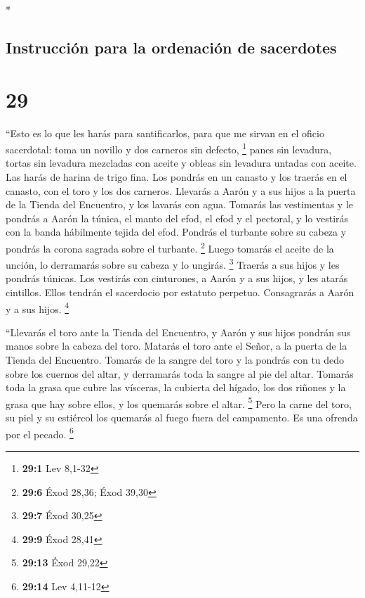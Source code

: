 \begin{paracol}{2}
\begin{otherlanguage}{english}
\end{otherlanguage}

\switchcolumn[0]*

\hypertarget{instrucciuxf3n-para-la-ordenaciuxf3n-de-sacerdotes}{%
\subsection{Instrucción para la ordenación de
sacerdotes}\label{instrucciuxf3n-para-la-ordenaciuxf3n-de-sacerdotes}}

\hypertarget{section-56}{%
\section{29}\label{section-56}}

 ``Esto es lo que les harás para santificarlos, para que
me sirvan en el oficio sacerdotal: toma un novillo y dos carneros sin
defecto, \footnote{\textbf{29:1} Lev 8,1-32}  panes sin
levadura, tortas sin levadura mezcladas con aceite y obleas sin levadura
untadas con aceite. Las harás de harina de trigo fina. 
Los pondrás en un canasto y los traerás en el canasto, con el toro y los
dos carneros.  Llevarás a Aarón y a sus hijos a la puerta
de la Tienda del Encuentro, y los lavarás con agua. 
Tomarás las vestimentas y le pondrás a Aarón la túnica, el manto del
efod, el efod y el pectoral, y lo vestirás con la banda hábilmente
tejida del efod.  Pondrás el turbante sobre su cabeza y
pondrás la corona sagrada sobre el turbante. \footnote{\textbf{29:6}
  Éxod 28,36; Éxod 39,30}  Luego tomarás el aceite de la
unción, lo derramarás sobre su cabeza y lo ungirás. \footnote{\textbf{29:7}
  Éxod 30,25}  Traerás a sus hijos y les pondrás túnicas.
 Los vestirás con cinturones, a Aarón y a sus hijos, y les
atarás cintillos. Ellos tendrán el sacerdocio por estatuto perpetuo.
Consagrarás a Aarón y a sus hijos. \footnote{\textbf{29:9} Éxod 28,41}

 ``Llevarás el toro ante la Tienda del Encuentro, y Aarón
y sus hijos pondrán sus manos sobre la cabeza del toro. 
Matarás el toro ante el Señor, a la puerta de la Tienda del Encuentro.
 Tomarás de la sangre del toro y la pondrás con tu dedo
sobre los cuernos del altar, y derramarás toda la sangre al pie del
altar.  Tomarás toda la grasa que cubre las vísceras, la
cubierta del hígado, los dos riñones y la grasa que hay sobre ellos, y
los quemarás sobre el altar. \footnote{\textbf{29:13} Éxod 29,22}
 Pero la carne del toro, su piel y su estiércol los
quemarás al fuego fuera del campamento. Es una ofrenda por el pecado.
\footnote{\textbf{29:14} Lev 4,11-12}


\end{paracol}
